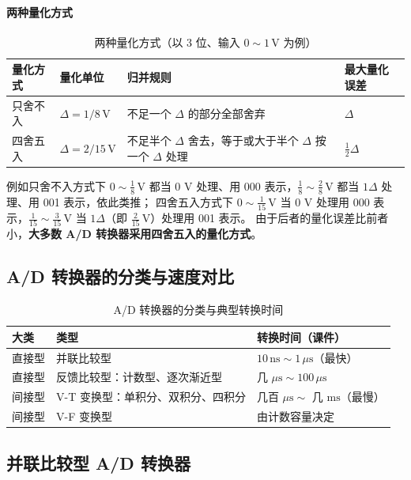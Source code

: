 \paragraph{两种量化方式}
\begin{table}[htbp]
\centering
\caption{两种量化方式（以 3 位、输入 $0\sim1\,\mathrm{V}$ 为例）}
\begin{tabular}{p{}p{}p{}p{}}
\toprule
量化方式 & 量化单位 & 归并规则 & 最大量化误差 \\
\midrule
只舍不入 & $\Delta=1/8\,\mathrm{V}$ & 不足一个 $\Delta$ 的部分全部舍弃 & $\Delta$ \\
四舍五入 & $\Delta=2/15\,\mathrm{V}$ & 不足半个 $\Delta$ 舍去，等于或大于半个 $\Delta$ 按一个 $\Delta$ 处理 & $\frac{1}{2}\Delta$ \\
\bottomrule
\end{tabular}
\end{table}
例如只舍不入方式下 $0\sim\frac{1}{8}\,\mathrm{V}$ 都当 0 V 处理、用 000 表示，$\frac{1}{8}\sim\frac{2}{8}\,\mathrm{V}$ 都当 $1\Delta$ 处理、用 001 表示，依此类推；
四舍五入方式下 $0\sim\frac{1}{15}\,\mathrm{V}$ 当 0 V 处理用 000 表示，$\frac{1}{15}\sim\frac{3}{15}\,\mathrm{V}$ 当 $1\Delta$（即 $\frac{2}{15}\,\mathrm{V}$）处理用 001 表示。
由于后者的量化误差比前者小，\textbf{大多数 A/D 转换器采用四舍五入的量化方式}。

\subsection{A/D 转换器的分类与速度对比}
\begin{table}[htbp]
\centering
\caption{A/D 转换器的分类与典型转换时间}
\begin{tabular}{lll}
\toprule
大类 & 类型 & 转换时间（课件） \\
\midrule
直接型 & 并联比较型 & $10\,\mathrm{ns}\sim1\,\mu\mathrm{s}$（最快） \\
直接型 & 反馈比较型：计数型、逐次渐近型 & 几 $\mu\mathrm{s}\sim100\,\mu\mathrm{s}$ \\
间接型 & V-T 变换型：单积分、双积分、四积分 & 几百 $\mu\mathrm{s}\sim$ 几 $\mathrm{ms}$（最慢） \\
间接型 & V-F 变换型 & 由计数容量决定 \\
\bottomrule
\end{tabular}
\end{table}

\subsection{并联比较型 A/D 转换器}
